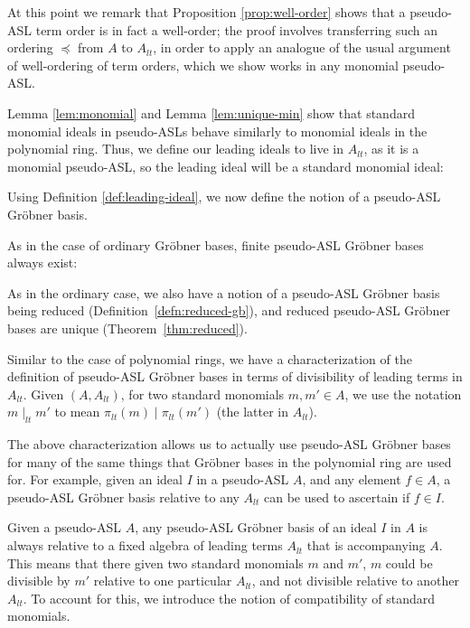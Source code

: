 \documentclass[11pt,reqno]{amsart}
\newcommand{\divides}{\mid}
\newcommand{\ltdivides}{\mid_{lt}}
\newcommand{\gb}{Gr\"{o}bner }
\theoremstyle{definition}
\numberwithin{equation}{section}
\begin{document}

At this point we remark that Proposition \ref{prop:well-order} shows that a pseudo-ASL term order is in fact a well-order; the proof involves transferring such an ordering $\preceq$ from $A$ to $A_{lt}$, in order to apply an analogue of the usual argument of well-ordering of term orders, which we show works in any monomial pseudo-ASL.

Lemma \ref{lem:monomial} and Lemma \ref{lem:unique-min} show that standard monomial ideals in pseudo-ASLs behave similarly to monomial ideals in the polynomial ring. Thus, we define our leading ideals to live in $A_{lt}$, as it is a monomial pseudo-ASL, so the leading ideal will be a standard monomial ideal:


Using Definition \ref{def:leading-ideal}, we now define the notion of a pseudo-ASL \gb basis.


As in the case of ordinary Gröbner bases, finite pseudo-ASL Gröbner bases always exist:


As in the ordinary case, we also have a notion of a pseudo-ASL Gröbner basis being reduced (Definition~\ref{defn:reduced-gb}), and reduced pseudo-ASL Gröbner bases are unique (Theorem~\ref{thm:reduced}).

Similar to the case of polynomial rings, we have a characterization of the definition of pseudo-ASL \gb bases in terms of divisibility of leading terms in $A_{lt}$. Given $(A, A_{lt})$, for two standard monomials $m,m' \in A$, we use the notation $m \ltdivides m'$ to mean $\pi_{lt}(m) \divides \pi_{lt}(m')$ (the latter in $A_{lt}$).


The above characterization allows us to actually use pseudo-ASL \gb bases for many of the same things that \gb bases in the polynomial ring are used for. For example, given an ideal $I$ in a pseudo-ASL $A$, and any element $f \in A$, a pseudo-ASL \gb basis relative to any $A_{lt}$ can be used to ascertain if $f \in I$.


Given a pseudo-ASL $A$, any pseudo-ASL \gb basis of an ideal $I$ in $A$ is always relative to a fixed algebra of leading terms $A_{lt}$ that is accompanying $A$. This means that there given two standard monomials $m$ and $m'$, $m$ could be divisible by $m'$ relative to one particular $A_{lt}$, and not divisible relative to another $A_{lt}$. To account for this, we introduce the notion of compatibility of standard monomials.
\end{document}
